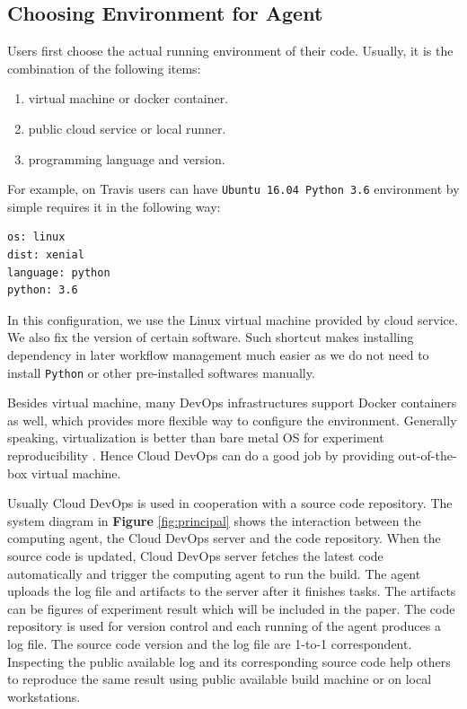 \documentclass[10pt, conference, compsocconf]{IEEEtran}
\begin{document}
\subsection{Choosing Environment for Agent}
Users first choose the actual running environment of their code. Usually, it is the combination of the following items:
\begin{enumerate}
\item virtual machine or docker container.
\item public cloud service or local runner.
\item programming language and version.
\end{enumerate}

For example, on Travis users can have  \texttt{Ubuntu 16.04 Python 3.6} environment by simple requires it in the following way:
\begin{lstlisting}[caption={environment configuration}]
os: linux
dist: xenial
language: python
python: 3.6
\end{lstlisting}

In this configuration, we use the Linux virtual machine provided by cloud service. We also fix the version of certain software. 
Such shortcut makes installing dependency in later workflow management much easier as we do not need to install \texttt{Python} or other pre-installed softwares manually.

Besides virtual machine, many DevOps infrastructures support Docker containers as well, which provides more flexible way to configure the environment. Generally speaking, virtualization is better than bare metal OS for experiment reproducibility \cite{Howe12}. Hence Cloud DevOps can do a good job by providing out-of-the-box virtual machine.

Usually Cloud DevOps is used in cooperation with a source code repository. The system diagram in \textbf{Figure} \ref{fig:principal} shows the interaction between the computing agent, the Cloud DevOps server and the code repository. When the source code is updated, Cloud DevOps server fetches the latest code automatically and trigger the computing agent to run the build. The agent uploads the log file and artifacts to the server after it finishes tasks. The artifacts can be figures of experiment result which will be included in the paper. 
The code repository is used for version control and each running of the agent produces a log file. The source code version and the log file are 1-to-1 correspondent. Inspecting the public available log and its corresponding source code help others to reproduce the same result using public available build machine or on local workstations.
\end{document}
